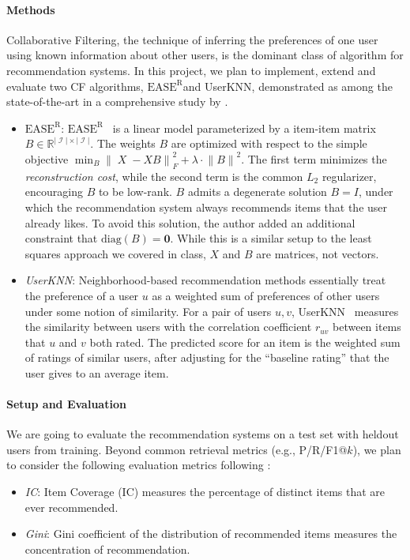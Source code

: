 \documentclass{article}
\DeclareMathOperator{\X}{\mathit{X}}
\DeclareMathOperator{\I}{\mathcal{I}}
\newcommand{\card}[1]{\ensuremath{\lvert {#1} \rvert}}
\newcommand{\easer}{$\text{EASE}^\text{R}$}
\newcommand{\userknn}{UserKNN\xspace}
\newcommand{\norm}[1]{\ensuremath{\lVert #1 \rVert}}
\begin{document}
\paragraph*{Methods}
Collaborative Filtering, the technique of inferring the preferences of one
 user using known information about other users, is the dominant class of
 algorithm for recommendation systems.
In this project, we plan to implement, extend and evaluate two CF algorithms,
 \easer and \userknn, demonstrated as among the state-of-the-art in a
 comprehensive study by \citet{anelliTopNRecommendationAlgorithms2022}.

\begin{itemize}
	\item {\em \easer}:
	      \easer~\citep{steckEmbarrassinglyShallowAutoencoders2019}
	      is a linear model parameterized by a item-item matrix $B \in
		      \mathbb{R}^{\card{\I} \times \card{\I}}$.
	      The weights $B$ are optimized with respect to the simple objective $\min_B
		       \norm{\X - X B}_F^2 + \lambda \cdot \norm{B}^2$.
	      The first term minimizes the {\em reconstruction cost}, while the second term
	       is the common $L_2$ regularizer, encouraging $B$ to be low-rank.
	      $B$ admits a degenerate solution $B = I$, under which the
	      recommendation
	      system always recommends items that the user already likes.
	      To avoid this solution, the author added an additional constraint that
	      $\mathrm{diag}(B) = \mathbf{0}$. While this is a similar setup to the 
        least squares approach we covered in class, $X$ and $B$ are matrices, 
        not vectors. 

	      \item{\em \userknn}: Neighborhood-based recommendation methods
	      essentially
	      treat the preference of a user $u$ as a weighted sum of
	      preferences of other
	      users under some notion of similarity.
	      For a pair of users $u, v$,
	       \userknn~\citep{resnickGroupLensOpenArchitecture1994} measures the similarity
	       between users with the correlation coefficient $r_{uv}$ between items that $u$
	       and $v$ both rated.
	      The predicted score for an item is the weighted sum of ratings of similar
	       users, after adjusting for the ``baseline rating'' that the user gives to an
	       average item.
\end{itemize}

\paragraph*{Setup and Evaluation}
We are going to evaluate the recommendation systems on a test set with heldout
 users from training.
Beyond common retrieval metrics (e.g., P/R/F1@$k$), we plan to consider the
 following evaluation metrics following
 \citet{anelliTopNRecommendationAlgorithms2022}:  \begin{itemize} \item {\em
             IC}: Item Coverage (IC) measures the percentage of distinct items that are ever
 recommended.
\item {\em Gini}: Gini coefficient of the distribution of recommended items
measures the concentration of recommendation.
\end{itemize}
\end{document}
